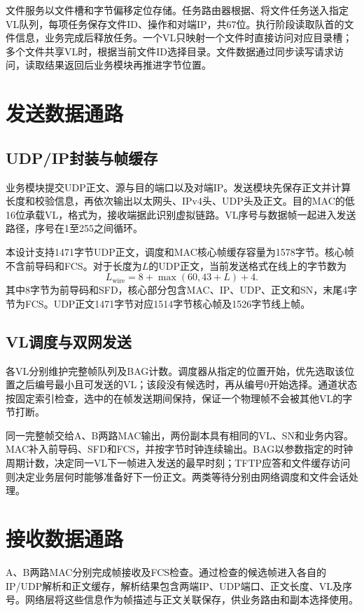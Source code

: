 文件服务以文件槽和字节偏移定位存储。任务路由器根据、将文件任务送入指定VL队列，每项任务保存文件ID、操作和对端IP，共67位。执行阶段读取队首的文件信息，业务完成后释放任务。一个VL只映射一个文件时直接访问对应目录槽；多个文件共享VL时，根据当前文件ID选择目录。文件数据通过同步读写请求访问，读取结果返回后业务模块再推进字节位置。

\section{发送数据通路}
\subsection{UDP/IP封装与帧缓存}
业务模块提交UDP正文、源与目的端口以及对端IP。发送模块先保存正文并计算长度和校验信息，再依次输出以太网头、IPv4头、UDP头及正文。目的MAC的低16位承载VL，格式为，接收端据此识别虚拟链路。VL序号与数据帧一起进入发送路径，序号在1至255之间循环。

本设计支持1471字节UDP正文，调度和MAC核心帧缓存容量为1578字节。核心帧不含前导码和FCS。对于长度为$L$的UDP正文，当前发送格式在线上的字节数为
\[L_{\mathrm{wire}}=8+\max(60,43+L)+4.\]
其中8字节为前导码和SFD，核心部分包含MAC、IP、UDP、正文和SN，末尾4字节为FCS。UDP正文1471字节对应1514字节核心帧及1526字节线上帧。

\subsection{VL调度与双网发送}
各VL分别维护完整帧队列及BAG计数。调度器从指定的位置开始，优先选取该位置之后编号最小且可发送的VL；该段没有候选时，再从编号0开始选择。通道状态按固定索引检查，选中的在帧发送期间保持，保证一个物理帧不会被其他VL的字节打断。

同一完整帧交给A、B两路MAC输出，两份副本具有相同的VL、SN和业务内容。MAC补入前导码、SFD和FCS，并按字节时钟连续输出。BAG以参数指定的时钟周期计数，决定同一VL下一帧进入发送的最早时刻；TFTP应答和文件缓存访问则决定业务层何时能够准备好下一份正文。两类等待分别由网络调度和文件会话处理。

\section{接收数据通路}
A、B两路MAC分别完成帧接收及FCS检查。通过检查的候选帧进入各自的IP/UDP解析和正文缓存，解析结果包含两端IP、UDP端口、正文长度、VL及序号。网络层将这些信息作为帧描述与正文关联保存，供业务路由和副本选择使用。

